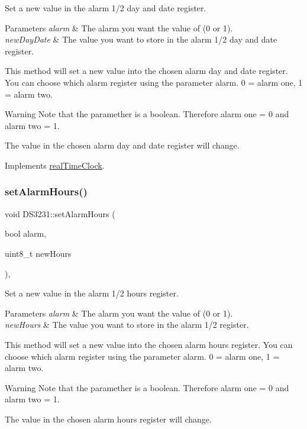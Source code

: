 Set a new value in the alarm 1/2 day and date register. 


\begin{DoxyParams}{Parameters}
{\em alarm} & The alarm you want the value of (0 or 1). \\
\hline
{\em new\+Day\+Date} & The value you want to store in the alarm 1/2 day and date register.\\
\hline
\end{DoxyParams}
This method will set a new value into the chosen alarm day and date register. You can choose which alarm register using the parameter alarm. 0 = alarm one, 1 = alarm two. \begin{DoxyWarning}{Warning}
Note that the paramether is a boolean. Therefore alarm one = 0 and alarm two = 1. 

The value in the chosen alarm day and date register will change. 
\end{DoxyWarning}


Implements \mbox{\hyperlink{classreal_time_clock_a2c2bb16a7fc59f463fb3aaed2fcd1926}{real\+Time\+Clock}}.

\mbox{\label{class_d_s3231_a0bcc7e2285869ffbe29d19c593f5a447}} 
\subsubsection{\texorpdfstring{set\+Alarm\+Hours()}{setAlarmHours()}}
{\footnotesize\ttfamily void D\+S3231\+::set\+Alarm\+Hours (\begin{DoxyParamCaption}\item[{bool}]{alarm,  }\item[{uint8\+\_\+t}]{new\+Hours }\end{DoxyParamCaption})\hspace{0.3cm}{\ttfamily [override]}, {\ttfamily [virtual]}}



Set a new value in the alarm 1/2 hours register. 


\begin{DoxyParams}{Parameters}
{\em alarm} & The alarm you want the value of (0 or 1). \\
\hline
{\em new\+Hours} & The value you want to store in the alarm 1/2 register.\\
\hline
\end{DoxyParams}
This method will set a new value into the chosen alarm hours register. You can choose which alarm register using the parameter alarm. 0 = alarm one, 1 = alarm two. \begin{DoxyWarning}{Warning}
Note that the paramether is a boolean. Therefore alarm one = 0 and alarm two = 1. 

The value in the chosen alarm hours register will change. 
\end{DoxyWarning}


